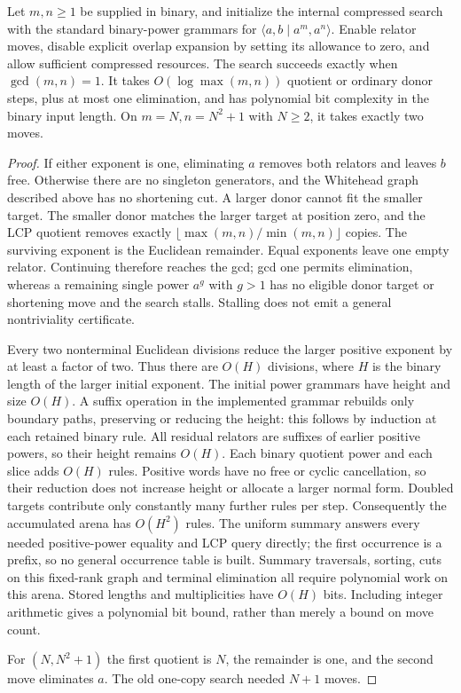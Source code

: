 \begin{proposition}
Let $m,n\ge1$ be supplied in binary, and initialize the internal compressed
search with the standard binary-power grammars for
$\langle a,b\mid a^m,a^n\rangle$. Enable relator moves, disable explicit
overlap expansion by setting its allowance to zero, and allow sufficient
compressed resources. The search succeeds exactly when $\gcd(m,n)=1$.
It takes $O(\log\max(m,n))$ quotient or ordinary donor steps, plus at most
one elimination, and has polynomial bit complexity in the binary input
length. On $m=N,n=N^2+1$ with $N\ge2$, it takes exactly two moves.
\end{proposition}
\begin{proof}
If either exponent is one, eliminating $a$ removes both relators and leaves
$b$ free. Otherwise there are no singleton generators, and the Whitehead
graph described above has no shortening cut. A larger donor cannot fit the
smaller target. The smaller donor matches the larger target at position
zero, and the LCP quotient removes exactly
$\lfloor\max(m,n)/\min(m,n)\rfloor$ copies. The surviving exponent is the
Euclidean remainder. Equal exponents leave one empty relator. Continuing
therefore reaches the gcd; gcd one permits elimination, whereas a remaining
single power $a^g$ with $g>1$ has no eligible donor target or shortening move
and the search stalls. Stalling does not emit a general nontriviality
certificate.

Every two nonterminal Euclidean divisions reduce the larger positive
exponent by at least a factor of two. Thus there are $O(H)$ divisions,
where $H$ is the binary length of the larger initial exponent. The initial
power grammars have height and size $O(H)$. A suffix operation in the
implemented grammar rebuilds only boundary paths, preserving or reducing
the height: this follows by induction at each retained binary rule.
All residual relators are suffixes of earlier positive powers, so their
height remains $O(H)$. Each binary quotient power and each slice adds
$O(H)$ rules. Positive words have no free or cyclic cancellation, so their
reduction does not increase height or allocate a larger normal form.
Doubled targets contribute only constantly many further rules per step.
Consequently the accumulated arena has $O(H^2)$ rules. The uniform summary
answers every needed positive-power equality and LCP query directly; the
first occurrence is a prefix, so no general occurrence table is built.
Summary traversals, sorting, cuts on this fixed-rank graph and terminal
elimination all require polynomial work on this arena. Stored lengths and
multiplicities have $O(H)$ bits. Including integer arithmetic gives a
polynomial bit bound, rather than merely a bound on move count.

For $(N,N^2+1)$ the first quotient is $N$, the remainder is one, and the
second move eliminates $a$. The old one-copy search needed $N+1$ moves.
\end{proof}

